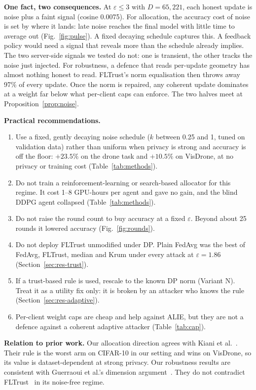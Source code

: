 \documentclass[journal]{IEEEtran}
\newcommand{\eps}{\varepsilon}
\begin{document}
\textbf{One fact, two consequences.} At $\eps \le 3$ with $D = 65{,}221$, each honest update is noise
plus a faint signal (cosine 0.0075). For allocation, the accuracy cost of noise is set by where it
lands: late noise reaches the final model with little time to average out (Fig.~\ref{fig:pulse}). A
fixed decaying schedule captures this. A feedback policy would need a signal that reveals more than
the schedule already implies. The two server-side signals we tested do not: one is transient, the
other tracks the noise just injected. For robustness, a defence that reads per-update geometry has
almost nothing honest to read. FLTrust's norm equalisation then throws away 97\% of every update.
Once the norm is repaired, any coherent update dominates at a weight far below what per-client caps
can enforce. The two halves meet at Proposition~\ref{prop:noise}.

\textbf{Practical recommendations.}
\begin{enumerate}
  \item Use a fixed, gently decaying noise schedule ($k$ between 0.25 and 1, tuned on validation data) rather than uniform when privacy is
  strong and accuracy is off the floor: $+23.5\%$ on the drone task and $+10.5\%$ on VisDrone, at no
  privacy or training cost (Table~\ref{tab:methods}).
  \item Do not train a reinforcement-learning or search-based allocator for this regime. It cost 1--8
  GPU-hours per agent and gave no gain, and the blind DDPG agent collapsed (Table~\ref{tab:methods}).
  \item Do not raise the round count to buy accuracy at a fixed $\eps$. Beyond about 25 rounds it
  lowered accuracy (Fig.~\ref{fig:rounds}).
  \item Do not deploy FLTrust unmodified under DP. Plain FedAvg was the best of FedAvg, FLTrust,
  median and Krum under every attack at $\eps = 1.86$ (Section~\ref{sec:res-trust}).
  \item If a trust-based rule is used, rescale to the known DP norm (Variant N). Treat it as a utility
  fix only: it is broken by an attacker who knows the rule (Section~\ref{sec:res-adaptive}).
  \item Per-client weight caps are cheap and help against ALIE, but they are not a defence against a
  coherent adaptive attacker (Table~\ref{tab:cap}).
\end{enumerate}

\textbf{Relation to prior work.} Our allocation direction agrees with Kiani et
al.~\cite{kiani2025timeadaptive}. Their rule is the worst arm on CIFAR-10 in our setting and wins on
VisDrone, so its value is dataset-dependent at strong privacy. Our robustness results are consistent
with Guerraoui et al.'s dimension argument~\cite{guerraoui2021dpbyz}. They do not contradict
FLTrust~\cite{cao2021fltrust} in its noise-free regime.
\end{document}
